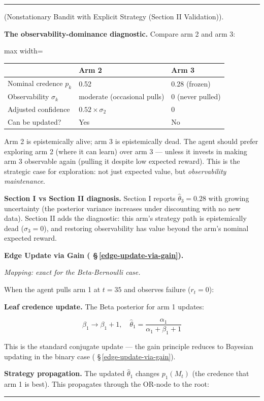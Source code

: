 \documentclass[11pt,oneside]{article}
\newcounter{claim}[section]
\renewcommand{\theclaim}{\thesection.\arabic{claim}}
\newenvironment{segment}[2]{%
  \refstepcounter{claim}%
  \bigskip\noindent\hrule\smallskip
  \noindent{\bfseries #1~\theclaim}\enskip(#2).\par\smallskip
  \noindent\ignorespaces
}{%
  \par\smallskip\noindent\hrule\bigskip
}
\newenvironment{remark}[1][]{\begin{segment}{Remark}{#1}}{\end{segment}}
\begin{document}
\begin{remark}[Nonstationary Bandit with Explicit Strategy (Section II Validation)]
\textbf{The observability-dominance diagnostic.} Compare arm 2 and arm 3:

\begin{adjustbox}{max width=\textwidth}
\small
\begin{tabular}{lll}
\toprule
 & Arm 2 & Arm 3 \\
\midrule
Nominal credence $p_k$ & 0.52 & 0.28 (frozen) \\
Observability $\sigma_k$ & moderate (occasional pulls) & 0 (never pulled) \\
Adjusted confidence & $0.52 \times \sigma_2$ & 0 \\
Can be updated? & Yes & No \\
\bottomrule
\end{tabular}
\end{adjustbox}


Arm 2 is epistemically alive; arm 3 is epistemically dead. The agent should prefer exploring arm 2 (where it can learn) over arm 3 — unless it invests in making arm 3 observable again (pulling it despite low expected reward). This is the strategic case for exploration: not just expected value, but \textit{observability maintenance}.

\textbf{Section I vs Section II diagnosis.} Section I reports $\hat\theta_3 = 0.28$ with growing uncertainty (the posterior variance increases under discounting with no new data). Section II adds the diagnostic: this arm's strategy path is epistemically dead ($\sigma_3 = 0$), and restoring observability has value beyond the arm's nominal expected reward.


\medskip\noindent\textbf{Edge Update via Gain ( \S\,\ref{edge-update-via-gain}).}


\textit{Mapping: exact for the Beta-Bernoulli case.}

When the agent pulls arm 1 at $t = 35$ and observes failure ($r_t = 0$):

\textbf{Leaf credence update.} The Beta posterior for arm 1 updates:

$$\beta_1 \to \beta_1 + 1, \quad \hat\theta_1 = \frac{\alpha_1}{\alpha_1 + \beta_1 + 1}$$

This is the standard conjugate update — the gain principle reduces to Bayesian updating in the binary case ( \S\,\ref{edge-update-via-gain}).

\textbf{Strategy propagation.} The updated $\hat\theta_1$ changes $p_1(M_t)$ (the credence that arm 1 is best). This propagates through the OR-node to the root:


\end{remark}
\end{document}
